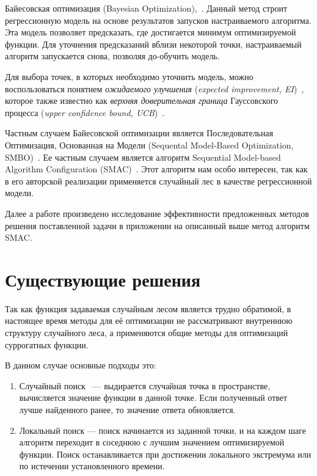 Байесовская оптимизация (Bayesian Optimization),~\cite{bayes1}. Данный
метод строит регрессионную модель на основе результатов запусков настраиваемого
алгоритма. Эта модель позволяет предсказать, где достигается минимум
оптимизируемой функции. Для уточнения предсказаний вблизи некоторой точки,
настраиваемый алгоритм запускается снова, позволяя до-обучить модель.

Для выбора точек, в которых необходимо уточнить модель, можно воспользоваться
понятием \emph{ожидаемого улучшения} (\emph{expected improvement,
EI})~\cite{globalopt}, которое также известно как \emph{верхняя доверительная
граница} Гауссовского процесса (\emph{upper confidence bound,
UCB})~\cite{gaussbandit}.

Частным случаем Байесовской оптимизации является Последовательная Оптимизация,
Основанная на Модели (Sequental Model-Based Optimization, SMBO)~\cite{smac}. Ее
частным случаем является алгоритм Sequential Model-based Algorithm Configuration
(SMAC)~\cite{elf}. Этот алгоритм нам особо интересен, так как в его авторской
реализации применяется случайный лес в качестве регрессионной модели.

Далее а работе произведено исследование эффективности предложенных методов
решения поставленной задачи в приложении на описанный выше метод алгоритм
SMAC.\@

\section{Существующие решения}

Так как функция задаваемая случайным лесом является трудно обратимой,
в настоящее время методы для её оптимизации не рассматривают внутреннюю
структуру случайного леса, а применяются общие методы для оптимизаций суррогатных
функции.

В данном случае основные подходы это:
\begin{enumerate}
    \item Случайный поиск~\cite{random} --- выдирается случайная точка в пространстве,
    вычисляется значение функции в данной точке. Если полученный ответ лучше
    найденного ранее, то значение ответа обновляется.
    \item Локальный поиск --- поиск начинается из заданной точки, и на каждом шаге
    алгоритм переходит в соседнюю с лучшим значением оптимизируемой функции. Поиск
    останавливается при достижении локального экстремума или по истечении
    установленного времени.
\end{enumerate}

